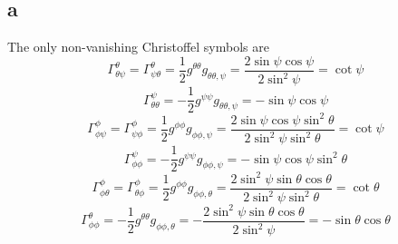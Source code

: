 \documentclass{article}
\begin{document}
\subsection*{a}
The only non-vanishing Christoffel symbols are
\[ \Gamma^\theta_{\theta\psi} = \Gamma^\theta_{\psi\theta} = \frac{1}{2}g^{\theta\theta}g_{\theta\theta,\psi}
	= \frac{2\sin\psi\cos\psi}{2\sin^2\psi} = \cot\psi \]
\[ \Gamma^\psi_{\theta\theta} = -\frac{1}{2}g^{\psi\psi}g_{\theta\theta,\psi} = -\sin\psi\cos\psi \]
\[ \Gamma^\phi_{\phi\psi} = \Gamma^\phi_{\psi\phi} = \frac{1}{2}g^{\phi\phi}g_{\phi\phi,\psi}
	= \frac{2\sin\psi\cos\psi\sin^2\theta}{2\sin^2\psi\sin^2\theta} = \cot\psi \]
\[ \Gamma^\psi_{\phi\phi} = -\frac{1}{2}g^{\psi\psi}g_{\phi\phi,\psi} = -\sin\psi\cos\psi\sin^2\theta\]
\[ \Gamma^\phi_{\phi\theta} =  \Gamma^\phi_{\theta\phi} = \frac{1}{2}g^{\phi\phi}g_{\phi\phi,\theta}
	= \frac{2\sin^2\psi\sin\theta\cos\theta}{2\sin^2\psi\sin^2\theta} = \cot\theta\]
\[ \Gamma^\theta_{\phi\phi} = -\frac{1}{2}g^{\theta\theta}g_{\phi\phi,\theta}
	= -\frac{2\sin^2\psi\sin\theta\cos\theta}{2\sin^2\psi} = -\sin\theta\cos\theta \]
\end{document}
